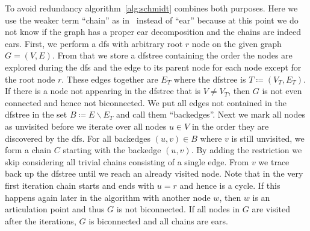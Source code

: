 To avoid redundancy algorithm~\ref{alg:schmidt} combines both purposes. Here we use the weaker term \enquote{chain} as in~\cite{schmidt2013} instead of \enquote{ear} because at this point we do not know if the graph has a proper ear decomposition and the chains are indeed ears.
First, we perform a \gls{dfs} with arbitrary root \(r\) node on the given graph \(G = (V, E)\). From that we store a \gls{dfstree} containing the order the nodes are explored during the \gls{dfs} and the edge to its parent node for each node except for the root node \(r\). These edges together are \(E_T\) where the \gls{dfstree} is \(T \coloneqq (V_T, E_T)\).
If there is a node not appearing in the \gls{dfstree} that is \(V \neq V_T\), then \(G\) is not even connected and hence not biconnected.
We put all edges not contained in the \gls{dfstree} in the set \(B \coloneqq E \backslash E_T\) and call them \enquote{backedges}. Next we mark all nodes as unvisited before we iterate over all nodes \(u \in V\) in the order they are discovered by the \gls{dfs}.
For all backedges \((u,v) \in B\) where \(v\) is still unvisited, we form a chain \(C\) starting with the backedge \((u,v)\). By adding the restriction we skip considering all trivial chains consisting of a single edge. From \(v\) we trace back up the \gls{dfstree} until we reach an already visited node. Note that in the very first iteration chain starts and ends with \(u = r\) and hence is a cycle.
If this happens again later in the algorithm with another node \(w\), then \(w\) is an articulation point and thus \(G\) is not biconnected. If all nodes in \(G\) are visited after the iterations, \(G\) is biconnected and all chains are ears.

